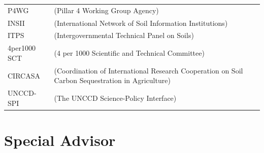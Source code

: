 \documentclass[
  10pt,
  b5paper,
]{book}
\begin{document}
\begin{longtable}[]{@{}ll@{}}
\toprule
\endhead
\begin{minipage}[t]{0.11\columnwidth}\raggedright
P4WG\strut
\end{minipage} & \begin{minipage}[t]{0.83\columnwidth}\raggedright
(Pillar 4 Working Group Agency)\strut
\end{minipage}\tabularnewline
\begin{minipage}[t]{0.11\columnwidth}\raggedright
INSII\strut
\end{minipage} & \begin{minipage}[t]{0.83\columnwidth}\raggedright
(International Network of Soil Information Institutions)\strut
\end{minipage}\tabularnewline
\begin{minipage}[t]{0.11\columnwidth}\raggedright
ITPS\strut
\end{minipage} & \begin{minipage}[t]{0.83\columnwidth}\raggedright
(Intergovernmental Technical Panel on Soils)\strut
\end{minipage}\tabularnewline
\begin{minipage}[t]{0.11\columnwidth}\raggedright
4per1000 SCT\strut
\end{minipage} & \begin{minipage}[t]{0.83\columnwidth}\raggedright
(4 per 1000 Scientific and Technical Committee)\strut
\end{minipage}\tabularnewline
\begin{minipage}[t]{0.11\columnwidth}\raggedright
CIRCASA\strut
\end{minipage} & \begin{minipage}[t]{0.83\columnwidth}\raggedright
(Coordination of International Research Cooperation on Soil Carbon Sequestration in Agriculture)\strut
\end{minipage}\tabularnewline
\begin{minipage}[t]{0.11\columnwidth}\raggedright
UNCCD-SPI\strut
\end{minipage} & \begin{minipage}[t]{0.83\columnwidth}\raggedright
(The UNCCD Science-Policy Interface)\strut
\end{minipage}\tabularnewline
\bottomrule
\end{longtable}

\hypertarget{special-advisor}{%
\section*{Special Advisor}\label{special-advisor}}
\end{document}
